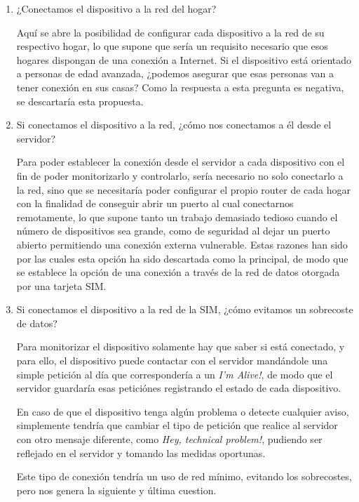 \begin{enumerate}
    \item ¿Conectamos el dispositivo a la red del hogar? 
    
    Aquí se abre la posibilidad de configurar cada dispositivo a la red de su respectivo hogar, lo que supone que sería un requisito necesario que esos hogares dispongan de una conexión a Internet. Si el dispositivo está orientado a personas de edad avanzada, ¿podemos asegurar que esas personas van a tener conexión en sus casas? Como la respuesta a esta pregunta es negativa, se descartaría esta propuesta.
    
    \item Si conectamos el dispositivo a la red, ¿cómo nos conectamos a él desde el servidor?
    
    Para poder establecer la conexión desde el servidor a cada dispositivo con el fin de poder monitorizarlo y controlarlo, sería necesario no solo conectarlo a la red, sino que se necesitaría poder configurar el propio router de cada hogar con la finalidad de conseguir abrir un puerto al cual conectarnos remotamente, lo que supone tanto un trabajo demasiado tedioso cuando el número de dispositivos sea grande, como de seguridad al dejar un puerto abierto permitiendo una conexión externa vulnerable.
    Estas razones han sido por las cuales esta opción ha sido descartada como la principal, de modo que se establece la opción de una conexión a través de la red de datos otorgada por una tarjeta SIM.  
    
    \item Si conectamos el dispositivo a la red de la SIM, ¿cómo evitamos un sobrecoste de datos?
    
    Para monitorizar el dispositivo solamente hay que saber si está conectado, y para ello, el dispositivo puede contactar con el servidor mandándole una simple petición al día que correspondería a un \textit{ I'm Alive!}, de modo que el servidor guardaría esas peticiónes registrando el estado de cada dispositivo.
    
    En caso de que el dispositivo tenga algún problema o detecte cualquier aviso, simplemente tendría que cambiar el tipo de petición que realice al servidor con otro mensaje diferente, como \textit{Hey, technical problem!}, pudiendo ser reflejado en el servidor y tomando las medidas oportunas.
    
    Este tipo de conexión tendría un uso de red mínimo, evitando los sobrecostes, pero nos genera la siguiente y última cuestion.
    

\end{enumerate}

